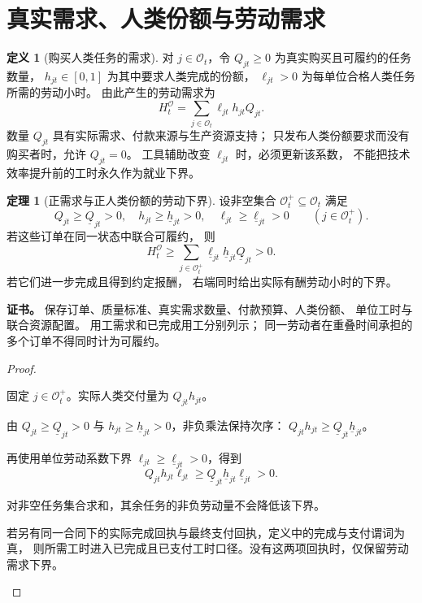 \documentclass[UTF8,12pt,a4paper,openany,fontset=none,zihao=false]{ctexrep}
\theoremstyle{definition}
\newtheorem{definition}{定义}[chapter]
\newtheorem{theorem}{定理}[chapter]
\newenvironment{certificate}{\par\noindent\textbf{证书。}\ignorespaces}{\par}
\newcommand{\1}{\mathbf 1}
\begin{document}
\section{真实需求、人类份额与劳动需求}

\begin{definition}[购买人类任务的需求]
\label{lab:def-human-demand}
对 \(j\in\mathcal O_t\)，令 \(Q_{jt}\ge0\) 为真实购买且可履约的任务数量，
\(h_{jt}\in[0,1]\) 为其中要求人类完成的份额，
\(\ell_{jt}>0\) 为每单位合格人类任务所需的劳动小时。
由此产生的劳动需求为
\[
 H_t^{\mathcal O}=\sum_{j\in\mathcal O_t}\ell_{jt}h_{jt}Q_{jt}.
\]
数量 \(Q_{jt}\) 具有实际需求、付款来源与生产资源支持；
只发布人类份额要求而没有购买者时，允许 \(Q_{jt}=0\)。
工具辅助改变 \(\ell_{jt}\) 时，必须更新该系数，
不能把技术效率提升前的工时永久作为就业下界。
\end{definition}

\begin{theorem}[正需求与正人类份额的劳动下界]
\label{lab:thm-positive-demand}
设非空集合 \(\mathcal O_t^+\subseteq\mathcal O_t\) 满足
\[
 Q_{jt}\ge\underline Q_{jt}>0,\quad
 h_{jt}\ge\underline h_{jt}>0,\quad
 \ell_{jt}\ge\underline\ell_{jt}>0
 \qquad(j\in\mathcal O_t^+).
\]
若这些订单在同一状态中联合可履约，
则
\[
 H_t^{\mathcal O}
 \ge\sum_{j\in\mathcal O_t^+}
 \underline\ell_{jt}\underline h_{jt}\underline Q_{jt}>0.
\]
若它们进一步完成且得到约定报酬，
右端同时给出实际有酬劳动小时的下界。
\end{theorem}
\begin{certificate}
保存订单、质量标准、真实需求数量、付款预算、人类份额、
单位工时与联合资源配置。
用工需求和已完成用工分别列示；
同一劳动者在重叠时间承担的多个订单不得同时计为可履约。
\end{certificate}
\begin{proof}
\begin{semanticsteps}
\item 固定 \(j\in\mathcal O_t^+\)。实际人类交付量为 \(Q_{jt}h_{jt}\)。
\item 由 \(Q_{jt}\ge\underline Q_{jt}>0\) 与
\(h_{jt}\ge\underline h_{jt}>0\)，非负乘法保持次序：
\(Q_{jt}h_{jt}\ge\underline Q_{jt}\underline h_{jt}\)。
\item 再使用单位劳动系数下界
\(\ell_{jt}\ge\underline\ell_{jt}>0\)，得到
\[
Q_{jt}h_{jt}\ell_{jt}
\ge\underline Q_{jt}\underline h_{jt}\underline\ell_{jt}>0.
\]
\item 对非空任务集合求和，其余任务的非负劳动量不会降低该下界。
\item 若另有同一合同下的实际完成回执与最终支付回执，定义中的完成与支付谓词为真，
则所需工时进入已完成且已支付工时口径。没有这两项回执时，仅保留劳动需求下界。
\end{semanticsteps}
\end{proof}
\end{document}
